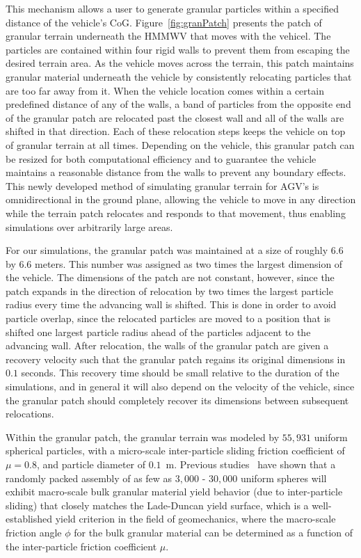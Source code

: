 \documentclass[12pt,twocolumn]{article}
\newcommand{\CHRONO}{{\sffamily{{Chrono}}}}
\begin{document}
This mechanism allows a user to generate granular particles within a specified distance of the vehicle's CoG. Figure~\ref{fig:granPatch} presents the patch of granular terrain underneath the {\CHRONO}  HMMWV that moves with the vehicel. The particles are contained within four rigid walls to prevent them from escaping the desired terrain area. As the vehicle moves across the terrain, this patch maintains granular material underneath the vehicle by consistently relocating particles that are too far away from it. When the vehicle location comes within a certain predefined distance of any of the walls, a band of particles from the opposite end of the granular patch are relocated past the closest wall and all of the walls are shifted in that direction. Each of these relocation steps keeps the vehicle on top of granular terrain at all times. Depending on the vehicle, this granular patch can be resized for both computational efficiency and to guarantee the vehicle maintains a reasonable distance from the walls to prevent any boundary effects. This newly developed method of simulating granular terrain for AGV's is omnidirectional in the ground plane, allowing the vehicle to move in any direction while the terrain patch relocates and responds to that movement, thus enabling simulations over arbitrarily large areas.

For our simulations, the granular patch was maintained at a size of roughly $6.6$ by $6.6$ meters.  This number was assigned as two times the largest dimension of the vehicle.  The dimensions of the patch are not constant, however, since the patch expands in the direction of relocation by two times the largest particle radius every time the advancing wall is shifted.  This is done in order to avoid particle overlap, since the relocated particles are moved to a position that is shifted one largest particle radius ahead of the particles adjacent to the advancing wall.  After relocation, the walls of the granular patch are given a recovery velocity such that the granular patch regains its original dimensions in $0.1$ seconds.  This recovery time should be small relative to the duration of the simulations, and in general it will also depend on the velocity of the vehicle, since the granular patch should completely recover its dimensions between subsequent relocations.

Within the granular patch, the granular terrain was modeled by $55,931$ uniform spherical particles, with a micro-scale inter-particle sliding friction coefficient of $\mu = 0.8$, and particle diameter of $0.1$~m.  Previous studies~\cite{fleischmannetalGEGE2014} have shown that 
a randomly packed assembly of as few as $3,000$ - $30,000$ uniform spheres will exhibit macro-scale bulk granular material yield behavior (due to inter-particle sliding) that closely matches the Lade-Duncan yield surface, which is a well-established yield criterion in the field of geomechanics, where the macro-scale friction angle $\phi$ for the bulk granular material can be determined as a function of the inter-particle friction coefficient $\mu$.
\end{document}
